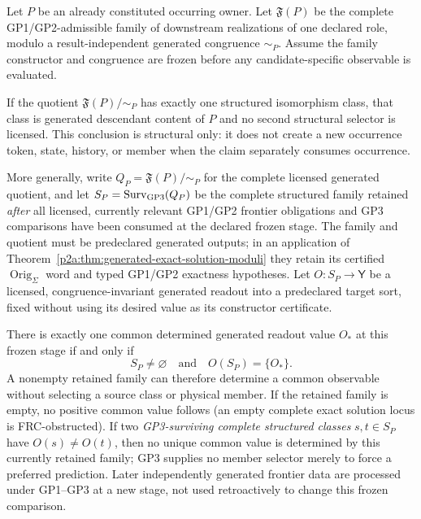 \documentclass[12pt,a4paper]{article}
\begin{document}
\begin{corollary}
\label{p2a:thm:compatible-family-observable-closure}
Let $P$ be an already constituted occurring owner.  Let
$\mathfrak F(P)$ be the complete GP1/GP2-admissible family of downstream
realizations of one declared role, modulo a result-independent generated
congruence $\sim_P$.  Assume the family constructor and congruence are frozen
before any candidate-specific observable is evaluated.

If the quotient $\mathfrak F(P)/{\sim_P}$ has exactly one structured
isomorphism class, that class is generated descendant content of $P$ and no
second structural selector is licensed.  This conclusion is structural only:
it does not create a new occurrence token, state, history, or member when the
claim separately consumes occurrence.

More generally, write $Q_P=\mathfrak F(P)/{\sim_P}$ for the complete
licensed generated quotient, and let $S_P=\operatorname{Surv}_{\rm GP3}(Q_P)$
be the complete structured family retained \emph{after} all licensed,
currently relevant GP1/GP2 frontier obligations and GP3 comparisons have
been consumed at the declared frozen stage.  The family and quotient must be
predeclared generated outputs; in an application of
Theorem~\ref{p2a:thm:generated-exact-solution-moduli} they retain its
certified $\operatorname{Orig}_{\Sigma}$ word and typed GP1/GP2 exactness
hypotheses.  Let $O:S_P\to\mathsf Y$ be a licensed,
congruence-invariant generated readout into a predeclared target sort, fixed
without using its desired value as its constructor certificate.

There is exactly one common determined generated readout value $O_*$ at this
frozen stage if and only if
\[
  \boxed{S_P\neq\varnothing\quad\text{and}\quad O(S_P)=\{O_*\}.}
\]
A nonempty retained family can therefore determine a common observable
without selecting a source class or physical member.  If the retained
family is empty, no positive common value follows (an empty complete exact
solution locus is FRC-obstructed).  If two \emph{GP3-surviving complete
structured classes} $s,t\in S_P$ have $O(s)\neq O(t)$, then no unique common
value is determined by this currently retained family; GP3 supplies no
member selector merely to force a preferred prediction.  Later independently
generated frontier data are processed under GP1--GP3 at a new stage, not
used retroactively to change this frozen comparison.
\end{corollary}
\end{document}
